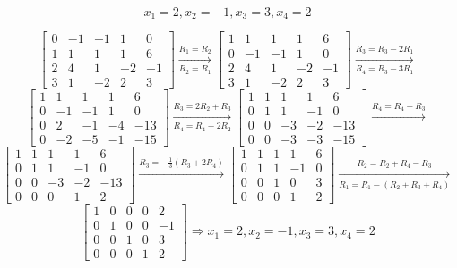 \documentclass[letter,11pt]{article}
\begin{document}
\begin{tcolorbox}[boxrule=1mm, width=(.9\linewidth),before=\hfill,after=\hfill, adjusted title={Problem 5 Solution}]
$$x_{1}=2, x_{2}=-1, x_{3}=3, x_{4}=2$$
\tcblower

$$\begin{bmatrix}
0 & -1 & -1 & 1 & 0 \\
1 & 1 & 1 & 1 & 6 \\
2 & 4 & 1 & -2 & -1 \\
3 & 1 & -2 & 2 & 3
\end{bmatrix}\xrightarrow[R_2=R_1]{R_1=R_2}
\begin{bmatrix}
1 & 1 & 1 & 1 & 6 \\
0 & -1 & -1 & 1 & 0 \\
2 & 4 & 1 & -2 & -1 \\
3 & 1 & -2 & 2 & 3
\end{bmatrix}\xrightarrow[R_4=R_3-3R_1]{R_3=R_3-2R_1}$$
$$\begin{bmatrix}
1 & 1 & 1 & 1 & 6 \\
0 & -1 & -1 & 1 & 0 \\
0 & 2 & -1 & -4 & -13 \\
0 & -2 & -5 & -1 & -15
\end{bmatrix}\xrightarrow[R_4=R_4-2R_2]{R_3=2R_2+R_3}
\begin{bmatrix}1 & 1 & 1 & 1 & 6 \\
0 & 1 & 1 & -1 & 0 \\
0 & 0 & -3 & -2 & -13 \\
0 & 0 & -3 & -3 & -15
\end{bmatrix}\xrightarrow{R_4=R_4-R_3}$$
$$\begin{bmatrix}
1 & 1 & 1 & 1 & 6 \\
0 & 1 & 1 & -1 & 0 \\
0 & 0 & -3 & -2 & -13 \\
0 & 0 & 0 & 1 & 2
\end{bmatrix}\xrightarrow{R_3=-\frac{1}{3}\left(R_3+2R_4\right)}
\begin{bmatrix}
1 & 1 & 1 & 1 & 6 \\
0 & 1 & 1 & -1 & 0 \\
0 & 0 & 1 & 0 & 3 \\
0 & 0 & 0 & 1 & 2
\end{bmatrix} \xrightarrow[R_1=R_1-\left(R_2+R_3+R_4\right)]{R_2=R_2+R_4-R_3}$$
$$\begin{bmatrix}
1 & 0 & 0 & 0 & 2 \\
0 & 1 & 0 & 0 & -1 \\
0 & 0 & 1 & 0 & 3 \\
0 & 0 & 0 & 1 & 2
\end{bmatrix} \Longrightarrow x_{1}=2, x_{2}=-1, x_{3}=3, x_{4}=2
$$

\end{tcolorbox}
\end{document}
